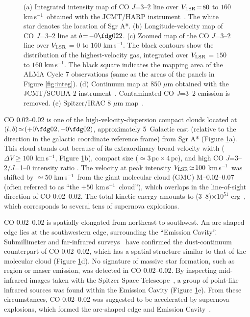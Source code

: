 \documentclass[twocolumn]{aastex631}
\newcommand\kms{\hbox{km$\,$s$^{-1}$}}
\begin{document}
\begin{figure*}[htbp]
\centering
{}
\caption{(a) Integrated intensity map of CO {\it J}=3--2 line over $V_{\rm LSR}\! =\! 80$ to $160$ \kms\ obtained with the JCMT/HARP instrument~\citep{Parsons18,Eden20}. The white star denotes the location of Sgr A*. (b) Longitude-velocity map of CO {\it J}=3--2 line at $b\! =\! -0\fdg022$. (c) Zoomed map of the CO {\it J}=3--2 line over $V_{\rm LSR}$ = $0$ to $160$ \kms . The black contours show the distribution of the highest-velocity gas, integrated over $V_{\rm LSR}$ = $150$ to $160$ \kms. The black square indicates the mapping area of the ALMA Cycle 7 observations (same as the areas of the panels in Figure \ref{fig:integ}). (d) Continuum map at $850$ {\rm $\mu$m} obtained with the JCMT/SCUBA-2 instrument~\citep{Parsons18}. Contaminated CO {\it J}=3--2 emission is removed. (e) Spitzer/IRAC $8$ {\rm $\mu$m} map~\citep{Stolovy06}.
\label{fig:guide}}
\end{figure*}

CO 0.02--0.02 is one of the high-velocity-dispersion compact clouds located at $(l, b)\!\simeq\! (+0\fdg02, -0\fdg02)$, approximately 5\arcmin\ Galactic east (relative to the direction in the galactic coordinate reference frame) from Sgr A* (Figure \ref{fig:guide}a). This cloud stands out because of its extraordinary broad velocity width ($\Delta V\!\ge\! 100$ \kms , Figure \ref{fig:guide}b), compact size ($\simeq\!3\,\mbox{pc}\times 4\,\mbox{pc}$), and high CO {\it J}=3--2/{\it J}=1--0 intensity ratio \citep[$\simeq\! 1.3$;][]{Oka99}. The velocity at peak intensity $V_{\rm LSR}\!\simeq\! 100$ \kms\ was shifted by $\simeq\! 50$ \kms\ from the giant molecular cloud (GMC) M--0.02--0.07 (often referred to as ``the $+50$ \kms\ cloud''), which overlaps in the line-of-sight direction of CO 0.02--0.02. The total kinetic energy amounts to (3--8)$\times 10^{51}$ {\rm erg}~\citep{Oka99}, which corresponds to several tens of supernova explosions.

CO 0.02--0.02 is spatially elongated from northeast to southwest. An arc-shaped edge lies at the southwestern edge, surrounding the ``Emission Cavity''. Submillimeter and far-infrared surveys~\citep{Contreras13,Parsons18,Molinari16} have confirmed the dust-continuum counterpart of CO 0.02--0.02, which has a spatial structure similar to that of the molecular cloud (Figure \ref{fig:guide}d). No signature of massive star formation, such as  region or maser emission, was detected in CO 0.02--0.02. By inspecting mid-infrared images taken with the Spitzer Space Telescope~\citep{Stolovy06}, a group of point-like infrared sources was found within the Emission Cavity (Figure \ref{fig:guide}e). From these circumstances, CO 0.02--0.02 was suggested to be accelerated by supernova explosions, which formed the arc-shaped edge and Emission Cavity~\citep{Oka08}.
\end{document}
